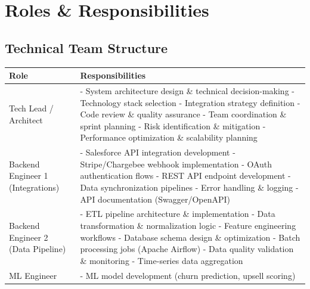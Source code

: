 \documentclass[12pt,a4paper]{article}
\begin{document}
\section{Roles \& Responsibilities}

\subsection{Technical Team Structure}
\begin{longtable}{|p{3cm}|p{11cm}|}
\hline
\textbf{Role} & \textbf{Responsibilities} \\
\hline
Tech Lead / Architect & - System architecture design \& technical decision-making \newline
- Technology stack selection \newline
- Integration strategy definition \newline
- Code review \& quality assurance \newline
- Team coordination \& sprint planning \newline
- Risk identification \& mitigation \newline
- Performance optimization \& scalability planning \\
\hline
Backend Engineer 1 (Integrations) & - Salesforce API integration development \newline
- Stripe/Chargebee webhook implementation \newline
- OAuth authentication flows \newline
- REST API endpoint development \newline
- Data synchronization pipelines \newline
- Error handling \& logging \newline
- API documentation (Swagger/OpenAPI) \\
\hline
Backend Engineer 2 (Data Pipeline) & - ETL pipeline architecture \& implementation \newline
- Data transformation \& normalization logic \newline
- Feature engineering workflows \newline
- Database schema design \& optimization \newline
- Batch processing jobs (Apache Airflow) \newline
- Data quality validation \& monitoring \newline
- Time-series data aggregation \\
\hline
ML Engineer & - ML model development (churn prediction, upsell scoring) \newline

\end{longtable}
\end{document}
